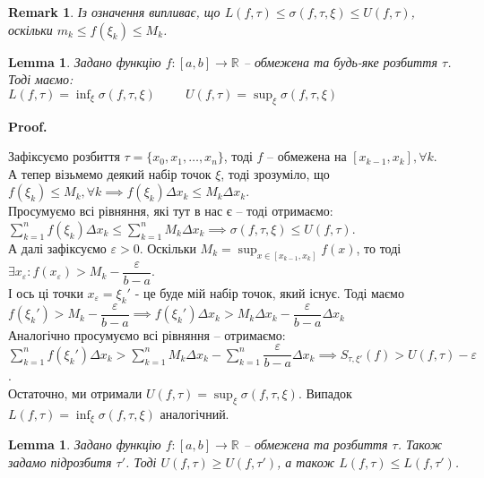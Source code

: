 \documentclass[a4paper, 10pt]{article}
\makeatletter
\def\huge{\displaystyle}
\def\qed{$\blacksquare$}
\theoremstyle{theoremdd}
\theoremstyle{theoremdd}
\theoremstyle{theoremdd}
\theoremstyle{theoremdd}
\theoremstyle{theoremdd}
\theoremstyle{theoremdd}
\theoremstyle{theoremdd}
\newtheorem{remark}[theorem]{Remark}
\theoremstyle{theoremdd}
\newtheorem{lemma}[theorem]{Lemma}
\theoremstyle{theoremdd}
\renewenvironment{proof}[1][Proof.\\]{\par
\pushQED{\hfill \qed}%
\normalfont \topsep6\p@\@plus6\p@\relax
\trivlist
\item\relax
{\bfseries
#1\@addpunct{.}}\hspace\labelsep\ignorespaces
}{%
\popQED\endtrivlist\@endpefalse
}
\makeatother
\begin{document}
\begin{remark}
Із означення випливає, що $L(f,\tau) \leq \sigma(f,\tau,\xi) \leq U(f,\tau)$, оскільки $m_k \leq f(\xi_k) \leq M_k$.
\end{remark}

\begin{lemma}
Задано функцію $f \colon [a,b] \to \mathbb{R}$ -- обмежена та будь-яке розбиття $\tau$. Тоді маємо:\\
$L(f,\tau) = \huge\inf_{\xi} \sigma(f,\tau,\xi) \hspace{1cm} U(f,\tau) = \huge\sup_{\xi} \sigma(f,\tau,\xi)$
\end{lemma}

\begin{proof}
Зафіксуємо розбиття $\tau = \{x_0,x_1,\dots,x_n\}$, тоді $f$ -- обмежена на $[x_{k-1},x_k], \forall k$.\\
А тепер візьмемо деякий набір точок $\xi$, тоді зрозуміло, що $f(\xi_k) \leq M_k, \forall k \implies f(\xi_k) \Delta x_k \leq M_k \Delta x_k$.\\
Просумуємо всі рівняння, які тут в нас є -- тоді отримаємо:\\
$\huge\sum_{k=1}^n f(\xi_k) \Delta x_k \leq \huge\sum_{k=1}^n M_k \Delta x_k \implies \sigma(f,\tau,\xi) \leq U(f, \tau)$.
\bigskip \\
А далі зафіксуємо $\varepsilon > 0$. Оскільки $M_k = \huge\sup_{x \in [x_{k-1},x_k]} f(x)$, то тоді $\exists x_\varepsilon: f(x_\varepsilon) > M_k - \dfrac{\varepsilon}{b-a}$.\\
І ось ці точки $x_\varepsilon = \xi_k'$ - це буде мій набір точок, який існує. Тоді маємо\\
$f(\xi_k') > M_k - \dfrac{\varepsilon}{b-a} \implies f(\xi_k') \Delta x_k > M_k \Delta x_k - \dfrac{\varepsilon}{b-a} \Delta x_k$\\
Аналогічно просумуємо всі рівняння -- отримаємо:\\
$\huge\sum_{k=1}^n f(\xi_k') \Delta x_k > \sum_{k=1}^n M_k \Delta x_k - \sum_{k=1}^n \dfrac{\varepsilon}{b-a} \Delta x_k \implies S_{\tau, \xi'}(f) > U(f,\tau) - \varepsilon$.\\
Остаточно, ми отримали $U(f, \tau) = \huge\sup_\xi \sigma(f,\tau,\xi)$. Випадок $L(f,\tau) = \huge\inf_\xi \sigma(f,\tau,\xi)$ аналогічний.
\end{proof}

\begin{lemma}
Задано функцію $f \colon [a,b] \to \mathbb{R}$ -- обмежена та розбиття $\tau$. Також задамо підрозбитя $\tau'$. Тоді $U(f,\tau) \geq U(f,\tau')$, а також $L(f,\tau) \leq L(f,\tau')$.
\end{lemma}
\end{document}
